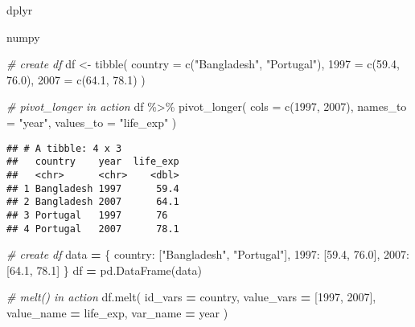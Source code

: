 \documentclass[
]{book}
\newenvironment{Shaded}{\begin{snugshade}}{\end{snugshade}}
\newcommand{\AttributeTok}[1]{\textcolor[rgb]{0.77,0.63,0.00}{#1}}
\newcommand{\CommentTok}[1]{\textcolor[rgb]{0.56,0.35,0.01}{\textit{#1}}}
\newcommand{\FloatTok}[1]{\textcolor[rgb]{0.00,0.00,0.81}{#1}}
\newcommand{\FunctionTok}[1]{\textcolor[rgb]{0.00,0.00,0.00}{#1}}
\newcommand{\NormalTok}[1]{#1}
\newcommand{\OperatorTok}[1]{\textcolor[rgb]{0.81,0.36,0.00}{\textbf{#1}}}
\newcommand{\OtherTok}[1]{\textcolor[rgb]{0.56,0.35,0.01}{#1}}
\newcommand{\SpecialCharTok}[1]{\textcolor[rgb]{0.00,0.00,0.00}{#1}}
\newcommand{\StringTok}[1]{\textcolor[rgb]{0.31,0.60,0.02}{#1}}
\begin{document}
dplyr

numpy

\begin{Shaded}
\begin{Highlighting}[]
\CommentTok{\# create df}
\NormalTok{df }\OtherTok{\textless{}{-}} \FunctionTok{tibble}\NormalTok{(}
  \AttributeTok{country =} \FunctionTok{c}\NormalTok{(}\StringTok{"Bangladesh"}\NormalTok{, }\StringTok{"Portugal"}\NormalTok{),}
  \StringTok{\textasciigrave{}}\AttributeTok{1997}\StringTok{\textasciigrave{}} \OtherTok{=} \FunctionTok{c}\NormalTok{(}\FloatTok{59.4}\NormalTok{, }\FloatTok{76.0}\NormalTok{),}
  \StringTok{\textasciigrave{}}\AttributeTok{2007}\StringTok{\textasciigrave{}} \OtherTok{=} \FunctionTok{c}\NormalTok{(}\FloatTok{64.1}\NormalTok{, }\FloatTok{78.1}\NormalTok{)}
\NormalTok{  )}

\CommentTok{\# pivot\_longer in action}
\NormalTok{df }\SpecialCharTok{\%\textgreater{}\%} 
  \FunctionTok{pivot\_longer}\NormalTok{(}
    \AttributeTok{cols =} \FunctionTok{c}\NormalTok{(}\StringTok{\textasciigrave{}}\AttributeTok{1997}\StringTok{\textasciigrave{}}\NormalTok{, }\StringTok{\textasciigrave{}}\AttributeTok{2007}\StringTok{\textasciigrave{}}\NormalTok{),}
    \AttributeTok{names\_to =} \StringTok{"year"}\NormalTok{,}
    \AttributeTok{values\_to =} \StringTok{"life\_exp"}
\NormalTok{  )}
\end{Highlighting}
\end{Shaded}

\begin{verbatim}
## # A tibble: 4 x 3
##   country    year  life_exp
##   <chr>      <chr>    <dbl>
## 1 Bangladesh 1997      59.4
## 2 Bangladesh 2007      64.1
## 3 Portugal   1997      76  
## 4 Portugal   2007      78.1
\end{verbatim}

\begin{Shaded}
\begin{Highlighting}[]
\CommentTok{\# create df}
\NormalTok{data }\OperatorTok{=}\NormalTok{ \{}
  \StringTok{\textquotesingle{}country\textquotesingle{}}\NormalTok{: [}\StringTok{"Bangladesh"}\NormalTok{, }\StringTok{"Portugal"}\NormalTok{],}
  \StringTok{\textquotesingle{}1997\textquotesingle{}}\NormalTok{: [}\FloatTok{59.4}\NormalTok{, }\FloatTok{76.0}\NormalTok{],}
  \StringTok{\textquotesingle{}2007\textquotesingle{}}\NormalTok{: [}\FloatTok{64.1}\NormalTok{, }\FloatTok{78.1}\NormalTok{]}
\NormalTok{\}}
\NormalTok{df }\OperatorTok{=}\NormalTok{ pd.DataFrame(data)}

\CommentTok{\# melt() in action}
\NormalTok{df.melt(}
\NormalTok{  id\_vars }\OperatorTok{=} \StringTok{\textquotesingle{}country\textquotesingle{}}\NormalTok{,}
\NormalTok{  value\_vars }\OperatorTok{=}\NormalTok{ [}\StringTok{\textquotesingle{}1997\textquotesingle{}}\NormalTok{, }\StringTok{\textquotesingle{}2007\textquotesingle{}}\NormalTok{],}
\NormalTok{  value\_name }\OperatorTok{=} \StringTok{\textquotesingle{}life\_exp\textquotesingle{}}\NormalTok{,}
\NormalTok{  var\_name }\OperatorTok{=} \StringTok{\textquotesingle{}year\textquotesingle{}}
\NormalTok{)}
\end{Highlighting}
\end{Shaded}
\end{document}
